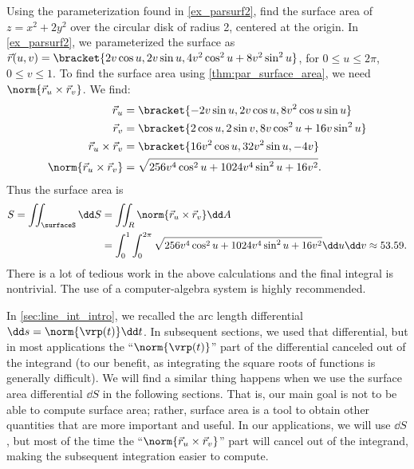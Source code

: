 \begin{example}\label{ex_parsurfarea1}%
Using the parameterization found in \autoref{ex_parsurf2}, find the surface area of $z=x^2+2y^2$ over the circular disk of radius 2, centered at the origin.
\solution
In \autoref{ex_parsurf2}, we parameterized the surface as $\vec r(u,v) =\\ \bracket{2v\cos u, 2v\sin u, 4v^2\cos^2u+8v^2\sin^2u}$, for $0\leq u\leq 2\pi$, $0\leq v\leq 1$. To find the surface area using \autoref{thm:par_surface_area}, we need $\norm{\vec r_u\times\vec r_v}$. We find:
\begin{align*}
\vec r_u &= \bracket{-2v\sin u, 2v\cos u, 8v^2\cos u\sin u}\\
\vec r_v &= \bracket{2\cos u, 2\sin v, 8v\cos^2 u+16v\sin^2u}\\
\vec r_u\times\vec r_v &= \bracket{16v^2\cos u, 32v^2\sin u, -4v}\\
\norm{\vec r_u\times\vec r_v} &= \sqrt{256v^4\cos^2u+1024v^4\sin^2u+16v^2}.
\end{align*}
Thus the surface area is
\begin{align*}
S = \iint_{\surfaceS} \dd S &= \iint_R\norm{\vec r_u\times \vec r_v}\dd A \\
& = \int_0^1\int_0^{2\pi} \sqrt{256v^4\cos^2u+1024v^4\sin^2u+16v^2}\dd u\dd v \approx 53.59.
\end{align*}
There is a lot of tedious work in the above calculations and the final integral is nontrivial. The use of a computer-algebra system is highly recommended.
\end{example}

In \autoref{sec:line_int_intro}, we recalled the arc length differential $\dd s=\norm{\vrp(t)}\dd t$. In subsequent sections, we used that differential, but in most applications the ``$\norm{\vrp(t)}$'' part of the differential canceled out of the integrand (to our benefit, as integrating the square roots of functions is generally difficult). We will find a similar thing happens when we use the surface area differential $\dd S$ in the following sections. That is, our main goal is not to be able to compute surface area; rather, surface area is a tool to obtain other quantities that are more important and useful. In our applications, we will use $\dd S$, but most of the time the ``$\norm{\vec r_u\times \vec r_v}$'' part will cancel out of the integrand, making the subsequent integration easier to compute.

